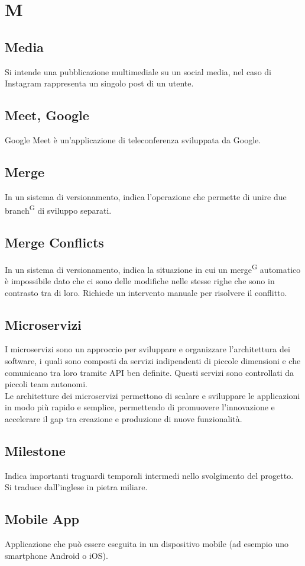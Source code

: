 \section{M}

\subsection{Media}
Si intende una pubblicazione multimediale su un social media, nel caso di Instagram rappresenta un singolo post di un utente.

\subsection{Meet, Google}
Google Meet è un'applicazione di teleconferenza sviluppata da Google. 

\subsection{Merge}
In un sistema di versionamento, indica l'operazione che permette di unire due branch\textsuperscript{G} di sviluppo separati.

\subsection{Merge Conflicts}
In un sistema di versionamento, indica la situazione in cui un merge\textsuperscript{G} automatico è impossibile dato che ci sono delle modifiche nelle stesse righe che sono in contrasto tra di loro. Richiede un intervento manuale  per risolvere il conflitto.

\subsection{Microservizi} I microservizi sono un approccio per sviluppare e organizzare l’architettura dei software, i quali sono composti da servizi indipendenti di piccole dimensioni e che comunicano tra loro tramite API ben definite. Questi servizi sono controllati da piccoli team autonomi. \\
Le architetture dei microservizi permettono di scalare e sviluppare le applicazioni in modo più rapido e semplice, permettendo di promuovere l’innovazione e accelerare il gap tra creazione e produzione di nuove funzionalità.

\subsection{Milestone}
Indica importanti traguardi temporali intermedi nello svolgimento del progetto. Si traduce dall'inglese in pietra miliare. 

\subsection{Mobile App} Applicazione che può essere eseguita in un dispositivo mobile (ad esempio uno smartphone Android o iOS).

\clearpage